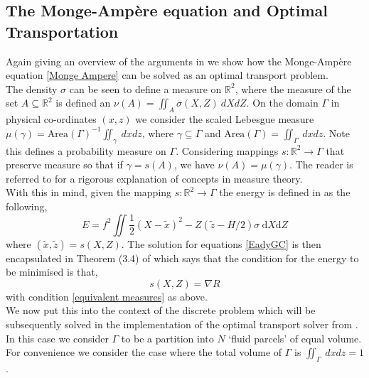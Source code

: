 \subsection{The Monge-Amp\`{e}re equation and Optimal Transportation}
Again giving an overview of the arguments in \cite{Cullen2006a} we show how the Monge-Amp\`{e}re equation \ref{Monge Ampere} can be solved as an optimal transport problem.
\\
\linebreak
The density $\sigma$ can be seen to define a measure on $\mathbb{R}^2$, where the measure of the set $A \subseteq \mathbb{R}^2$ is defined an $\nu(A) = \iint_{A} \sigma(X,Z) \ dXdZ$. On the domain $\Gamma$ in physical co-ordinates $(x,z)$ we consider the scaled Lebesgue measure $\mu(\gamma) = \textrm{Area}(\Gamma)^{-1}\iint_{\gamma} \ dxdz$, where $\gamma \subseteq \Gamma$ and $\textrm{Area}(\Gamma)=\iint_{\Gamma} \ dxdz$. Note this defines a probability measure on $\Gamma$. Considering mappings $s: \mathbb{R}^2 \rightarrow \Gamma$ that preserve measure so that if $\gamma = s(A)$, we have $\nu(A) = \mu(\gamma)$. The reader is referred to \cite{Rudin1987} for a rigorous explanation of concepts in measure theory.
\\
\linebreak
With this in mind, given the mapping $s: \mathbb{R}^2 \rightarrow \Gamma$ the energy is defined in \cite{Cullen2006a} as the following,
\begin{equation}
E = f^2 \iint \frac{1}{2}\left(X-\tilde{x}\right)^2 - Z\left(\tilde{z} - H/2\right)\sigma \ \textrm{d}X\textrm{d}Z
\end{equation}
where $\left(\tilde{x},\tilde{z}\right) = s(X,Z)$. The solution for equations \ref{EadyGC} is then encapsulated in Theorem (3.4) of \cite{Cullen2006a} which says that the condition for the energy to be minimised is that,
\begin{equation}
	s(X,Z) = \nabla R
\end{equation}
with condition \ref{equivalent measures} as above.
\\
\linebreak
We now put this into the context of the discrete problem which will be subsequently solved in the implementation of the optimal transport solver from \cite{Merigot2017}.
In this case we consider $\Gamma$ to be a partition into $N$ {\textquoteleft fluid parcels\textquoteright} of equal volume. For convenience we consider the case where the total volume of $\Gamma$ is $\iint_{\Gamma} \ dxdz = 1$.
\\
